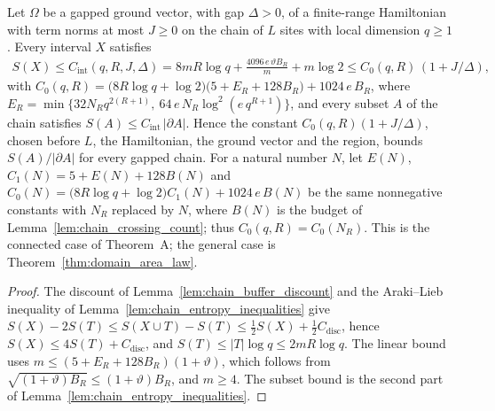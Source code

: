 \begin{theorem}
    \label{thm:chain_area_law}
    \leanok
    Let $\Omega$ be a gapped ground vector, with gap $\Delta>0$, of a
    finite-range Hamiltonian with term norms at most $J\ge0$ on the chain of
    $L$ sites with local dimension $q\ge1$. Every interval $X$ satisfies
    \begin{align}
        S(X)\le C_{\mathrm{int}}(q,R,J,\Delta)
        =8mR\log q+\frac{4096\,e\,\vartheta B_R}{m}+m\log2
        \le C_0(q,R)\,(1+J/\Delta),
    \end{align}
    with
    $C_0(q,R)=\bigl(8R\log q+\log2\bigr)\bigl(5+E_R+128B_R\bigr)
        +1024\,e\,B_R$, where
    $E_R=\min\{32N_Rq^{2(R+1)},\ 64\,e\,N_R\log^2(e\,q^{R+1})\}$, and every subset $A$ of the chain satisfies
    $S(A)\le C_{\mathrm{int}}\,|\partial A|$. Hence the constant
    $C_0(q,R)(1+J/\Delta)$, chosen before $L$, the Hamiltonian, the ground
    vector and the region, bounds $S(A)/|\partial A|$ for every gapped chain.
    For a natural number $N$, let $E(N)$, $C_1(N)=5+E(N)+128B(N)$ and
    $C_0(N)=\bigl(8R\log q+\log2\bigr)C_1(N)+1024\,e\,B(N)$ be the same
    nonnegative constants with $N_R$ replaced by $N$, where $B(N)$ is the
    budget of Lemma~\ref{lem:chain_crossing_count}; thus
    $C_0(q,R)=C_0(N_R)$.
    This is the connected case of Theorem~A; the general case is
    Theorem~\ref{thm:domain_area_law}.
\end{theorem}
\begin{proof}
    \leanok
    The discount of Lemma~\ref{lem:chain_buffer_discount} and the Araki--Lieb
    inequality of Lemma~\ref{lem:chain_entropy_inequalities} give
    $S(X)-2S(T)\le S(X\cup T)-S(T)\le\frac12S(X)+\frac12C_{\mathrm{disc}}$,
    hence $S(X)\le4S(T)+C_{\mathrm{disc}}$, and $S(T)\le|T|\log q\le
        2mR\log q$. The linear bound uses
    $m\le(5+E_R+128B_R)(1+\vartheta)$, which follows from
    $\sqrt{(1+\vartheta)B_R}\le(1+\vartheta)B_R$, and $m\ge4$. The subset
    bound is the second part of Lemma~\ref{lem:chain_entropy_inequalities}.
\end{proof}


